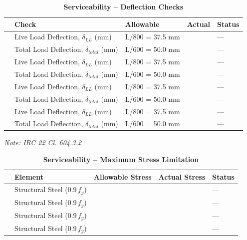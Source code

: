\documentclass[12pt,a4paper]{report}
\numberwithin{table}{chapter}
\numberwithin{figure}{chapter}
\begin{document}
\vspace{1em}
\begin{longtable}{|C{2.5cm}|L{3.5cm}|C{3.5cm}|>{\centering\arraybackslash}p{3.5cm}|C{2.5cm}|}
\caption{\textbf{Serviceability -- Deflection Checks}} \\
\hline
\textbf{} & \textbf{Check} & \textbf{Allowable} & \textbf{Actual} & \textbf{Status} \\[6pt]
\hline
{} & Live Load Deflection, $\delta_{LL}$ (mm) & L/800 = 37.5 mm &  & --- \\[6pt]
 & Total Load Deflection, $\delta_{total}$ (mm) & L/600 = 50.0 mm &  & --- \\[6pt]
\hline
{} & Live Load Deflection, $\delta_{LL}$ (mm) & L/800 = 37.5 mm &  & --- \\[6pt]
 & Total Load Deflection, $\delta_{total}$ (mm) & L/600 = 50.0 mm &  & --- \\[6pt]
\hline
{} & Live Load Deflection, $\delta_{LL}$ (mm) & L/800 = 37.5 mm &  & --- \\[6pt]
 & Total Load Deflection, $\delta_{total}$ (mm) & L/600 = 50.0 mm &  & --- \\[6pt]
\hline
{} & Live Load Deflection, $\delta_{LL}$ (mm) & L/800 = 37.5 mm &  & --- \\[6pt]
 & Total Load Deflection, $\delta_{total}$ (mm) & L/600 = 50.0 mm &  & --- \\[6pt]
\hline
\end{longtable}
\noindent\textit{Note: IRC 22 Cl. 604.3.2}

\vspace{1em}
\begin{longtable}{|C{2.5cm}|L{3.5cm}|C{3.5cm}|>{\centering\arraybackslash}p{3.5cm}|C{2.5cm}|}
\caption{\textbf{Serviceability -- Maximum Stress Limitation}} \\
\hline
\textbf{} & \textbf{Element} & \textbf{Allowable Stress} & \textbf{Actual Stress} & \textbf{Status} \\[6pt]
\hline
{} & Structural Steel ($0.9\,f_y$) &  &  & --- \\[6pt]
\hline
{} & Structural Steel ($0.9\,f_y$) &  &  & --- \\[6pt]
\hline
{} & Structural Steel ($0.9\,f_y$) &  &  & --- \\[6pt]
\hline
{} & Structural Steel ($0.9\,f_y$) &  &  & --- \\[6pt]
\hline
\end{longtable}
\end{document}
